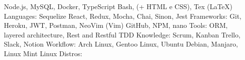 \begin{cvhonors}
  \cvhonor
    {Node.js, MySQL, Docker, TypeScript}
    {Bash, (+ HTML e CSS), Tex (LaTeX)}
    {}
    {Languages:}
  \cvhonor
    {Sequelize}
    {React, Redux, Mocha, Chai, Sinon, Jest}
    {}
    {Frameworks:}
  \cvhonor
    {Git, Heroku, JWT, Postman, NeoVim (Vim)}
    {GitHub, NPM, nano}
    {}
    {Tools:}
 \cvhonor
    {ORM, layered architecture, Rest and Restful}
    {TDD}
    {}
    {Knowledge:}
  \cvhonor
    {Scrum, Kanban}
    {Trello, Slack, Notion}
    {}
    {Workflow:}
  \cvhonor
    {Arch Linux, Gentoo Linux, Ubuntu}
    {Debian, Manjaro, Linux Mint}
    {}
    {Linux Distros:}
\end{cvhonors}

\vspace{.5cm}

